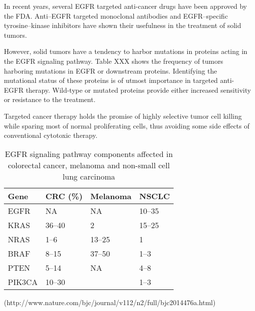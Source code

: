       In recent years, several EGFR targeted anti-cancer drugs have been
      approved by the FDA. Anti--EGFR targeted monoclonal antibodies and
      EGFR--specific tyrosine--kinase inhibitors have shown their usefulness in
      the treatment of solid tumors.

      However, solid tumors have a tendency to harbor mutations in proteins
      acting in  the EGFR signaling pathway. Table XXX shows the frequency of
      tumors  harboring mutations in EGFR or downstream proteins. Identifying
      the mutational status of these proteins is of utmost importance in
      targeted anti-EGFR therapy. Wild-type or mutated proteins provide either
      increased sensitivity or resistance to the treatment.


      Targeted cancer therapy holds the promise of highly selective
      tumor cell killing while sparing most of normal proliferating cells,
      thus avoiding some side effects of conventional cytotoxic therapy.

    \begin{table}[!htbp]
        \caption[Occurrence of mutations]{EGFR signaling pathway components affected in colorectal cancer, melanoma and non-small cell lung carcinoma}
        \centering
        \begin{tabular}{ |p{2cm}|p{2cm}|p{2cm}|p{2cm}|}
        \hline
        Gene & CRC (\%) & Melanoma & NSCLC \\ \hline \hline
        EGFR & NA & NA & 10--35 \\
        KRAS & 36--40 & 2 & 15--25 \\
        NRAS & 1--6 & 13--25 & 1 \\
        BRAF & 8--15 & 37--50 & 1--3 \\
        PTEN & 5--14 & NA & 4--8 \\
        PIK3CA & 10--30 & & 1--3 \\
        \hline
      \end{tabular}
    \end{table}
(http://www.nature.com/bjc/journal/v112/n2/full/bjc2014476a.html)

